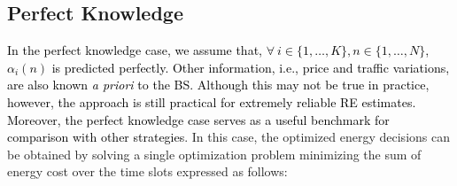 \documentclass[10pt, letter,twocolumn]{IEEEtran}
\begin{document}
\subsection{Perfect Knowledge}\vspace{-0.0cm}
\textcolor{black}{In the perfect knowledge case, we assume that, $\forall \ i \in \{1, \ldots,K\},n \in \{1, \ldots, N \}$, $\alpha_{i}(n)$ is predicted perfectly. Other information, i.e., price and traffic variations, are also known \emph{a priori} to the BS. Although this may not be true in practice, however, the approach is still practical for extremely reliable RE estimates. Moreover, the perfect knowledge case serves as a useful benchmark for comparison with other strategies}. In this case, the optimized energy decisions can be obtained by solving a single optimization problem minimizing the sum of energy cost over the time slots expressed as follows:
\end{document}
